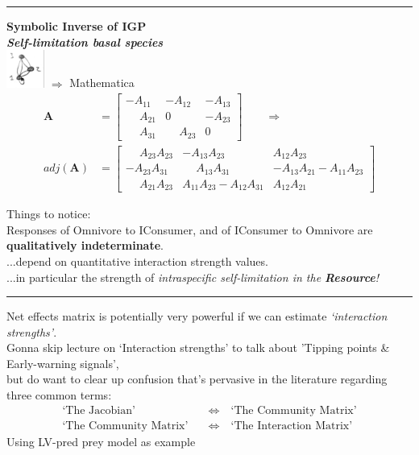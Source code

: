 \documentclass{article}
\newcommand{\ind}{\-\hspace{1cm}}
\begin{document}
\rule[0.5ex]{\linewidth}{1pt}

\textbf{Symbolic Inverse of IGP}\\
\emph{\textbf{Self-limitation basal species}}\\
\includegraphics[width=1.25cm]{figs/IGP_basal.pdf}
 $\Rightarrow$ Mathematica
\begin{align*}
	\mathbf{A}&=\begin{bmatrix}
	 -A_{11} & -A_{12} & -A_{13} \\
	 \phantom{-}A_{21} & 0 & -A_{23} \\
	 \phantom{-}A_{31} & \phantom{-}A_{23} & 0  \end{bmatrix} \qquad \Rightarrow\\
	 adj(\mathbf{A})&=\begin{bmatrix}
	  \phantom{-}A_{23}A_{23} & -A_{13} A_{23} & A_{12} A_{23} \\
	  -A_{23} A_{31} & \phantom{-}A_{13} A_{31} & \boxed{-A_{13} A_{21}-A_{11} A_{23}} \\
	  \phantom{-}A_{21} A_{23} & \boxed{A_{11} A_{23}-A_{12} A_{31}} & A_{12} A_{21}  \end{bmatrix}
\end{align*}

Things to notice:\\
Responses of Omnivore to IConsumer, and of IConsumer to Omnivore are \textbf{qualitatively indeterminate}.\\
\ind \ind  ...depend on quantitative interaction strength values.\\
\ind \ind \ind ...in particular the strength of \emph{intraspecific self-limitation in the \textbf{Resource}!}

\rule[0.5ex]{\linewidth}{1pt}
Net effects matrix is potentially very powerful if we can estimate \emph{`interaction strengths'}.\\
Gonna skip lecture on `Interaction strengths' to talk about 'Tipping points \& Early-warning signals',\\
\ind but do want to clear up confusion that's pervasive in the literature regarding three common terms:
\begin{align*}
	\text{`The Jacobian'} \quad &\Leftrightarrow \quad \text{`The Community Matrix'}\\
	\text{`The Community Matrix'}\quad &\Leftrightarrow \quad \text{`The Interaction Matrix'}
\end{align*}
Using LV-pred prey model as example
\end{document}
